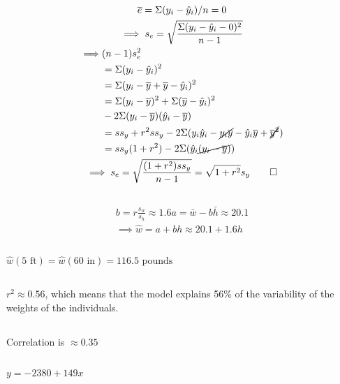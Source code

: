 \documentclass[twocolumn]{article}
\begin{document}
\subsection{}
\begin{gather*}
\bar e=\Sigma(y_i-\hat y_i)/n=0\\
\implies s_e=\sqrt{\frac{\Sigma(y_i-\hat y_i-0)^2}{n-1}}\\
\begin{aligned}
\implies &(n-1)s_e^2\\
&=\Sigma(y_i-\hat y_i)^2\\
&=\Sigma(y_i-\bar y+\bar y-\hat y_i)^2\\
&=\Sigma(y_i-\bar y)^2+\Sigma(\bar y-\hat y_i)^2\\&-2\Sigma(y_i-\bar y)(\hat y_i-\bar y)\\
&=ss_y+r^2ss_y-2\Sigma(y_i\hat y_i-\cancel{y_i\bar y}-\hat y_i\bar y+\cancel{{\bar y}^2})\\
&=ss_y(1+r^2)-2\Sigma(\hat y_i\cancel{(y_i-\bar y)})\\
\end{aligned}\\
\implies s_e=\sqrt{\frac{(1+r^2)ss_y}{n-1}}=\sqrt{1+r^2}s_y\qed
\end{gather*}

\subsection{}
\begin{gather*}
b=r\frac{s_w}{s_h}\approx 1.6 a=\bar w-b\bar h\approx 20.1\\
\implies \hat w=a+bh\approx 20.1+1.6h
\end{gather*}
\subsection{}
$\hat w(5 \text{ ft})=\hat w(60 \text{ in})=116.5\text{ pounds}$
\subsection{}
$r^2\approx0.56$, which means that the model explains 56\% of the variability of the weights of the individuals.

\subsection{}
Correlation is $\approx0.35$
\subsection{}
$y=-2380+149x$
\end{document}
